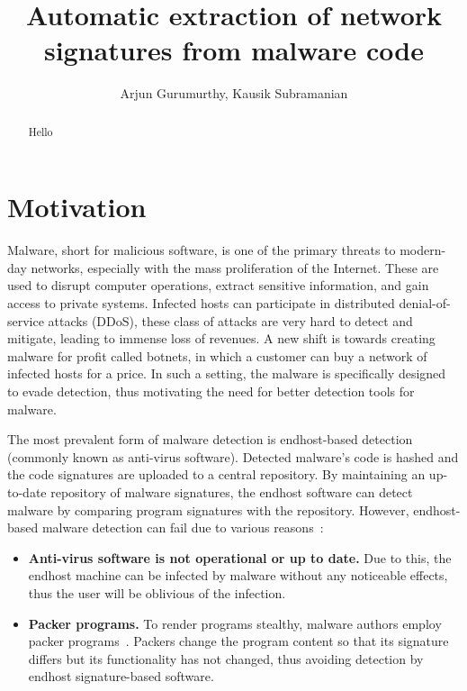 \documentclass[]{article}
\title{Automatic extraction of network signatures from malware code}
\author{Arjun Gurumurthy, Kausik Subramanian}
\begin{document}
\maketitle

\begin{abstract}
Hello
\end{abstract}

\section{Motivation}
Malware, short for malicious software, 
is one of the primary threats to modern-day networks, especially
with the mass proliferation of the Internet. These are used to 
disrupt computer operations, extract sensitive information, and 
gain access to private systems.  Infected hosts can participate 
in distributed denial-of-service attacks (DDoS), these class of 
attacks are very hard to detect and mitigate, leading to immense
loss of revenues. A new shift is towards creating malware for 
profit called botnets, in which a customer can buy a network of
infected hosts for a price. In such a setting, the malware is
specifically designed to evade detection, thus motivating the need
for better detection tools for malware. 

The most prevalent form of malware detection is endhost-based detection
(commonly known as anti-virus software). Detected malware's code is hashed
and the code signatures are uploaded to a central repository. By maintaining
an up-to-date repository of malware signatures, the endhost software can
detect malware by comparing program signatures with the repository. However, 
endhost-based malware detection can fail due to various reasons~\cite{networksig}:
\begin{itemize}
	\item \textbf{Anti-virus software is not operational or up to date.} 
	Due to this, the endhost machine can be infected by malware without any
	noticeable effects, thus the user will be oblivious of the infection.
	\item \textbf{Packer programs.} To render programs stealthy, malware authors
	employ packer programs~\cite{packer}. Packers change the program content so that
	its signature differs but its functionality has not changed, thus avoiding
	detection by endhost signature-based software.
\end{itemize}
\end{document}
